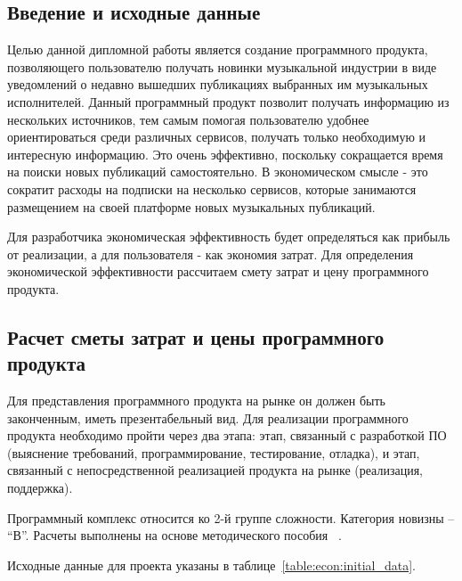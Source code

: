\subsection{Введение и исходные данные}

Целью данной дипломной работы является создание программного продукта, позволяющего пользователю получать новинки музыкальной индустрии в виде уведомлений о недавно вышедших публикациях выбранных им музыкальных исполнителей. Данный программный продукт позволит получать информацию из нескольких источников, тем самым помогая пользователю удобнее ориентироваться среди различных сервисов, получать только необходимую и интересную информацию. Это очень эффективно, поскольку сокращается время на поиски новых публикаций самостоятельно. В экономическом смысле - это сократит расходы на подписки на несколько сервисов, которые занимаются размещением на своей платформе новых музыкальных публикаций.

Для разработчика экономическая эффективность будет определяться как прибыль от реализации, а для пользователя - как экономия затрат. Для определения экономической эффективности рассчитаем смету затрат и цену программного продукта.

\subsection{Расчет сметы затрат и цены программного продукта}

Для представления программного продукта на рынке он должен быть законченным, иметь презентабельный вид. Для реализации программного продукта необходимо пройти через два этапа: этап, связанный с разработкой ПО (выяснение требований, программирование, тестирование, отладка), и этап, связанный с непосредственной реализацией продукта на рынке (реализация, поддержка).

Программный комплекс относится ко 2-й группе сложности. Категория новизны – “В”. Расчеты выполнены на основе методического пособия ~\cite{palicyn_2006}.

Исходные данные для проекта указаны в таблице~\ref{table:econ:initial_data}.

